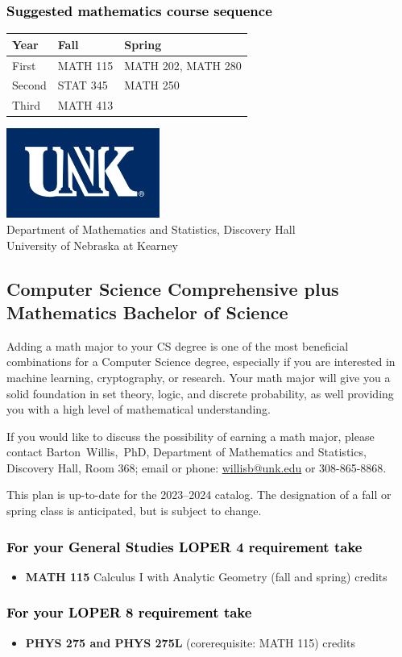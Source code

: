 \documentclass[11pt]{article}
\makeatletter
\newcommand{\calcone}{\textbf{MATH 115} Calculus I with Analytic Geometry (fall and spring) \dotfill 5 credits}
\newcommand{\calconeshort}{MATH 115}
\newcommand{\calctwoshort}{MATH 202}
\newcommand{\foundationsshort}{MATH 250}
\newcommand{\linearshort}{MATH 280}
\newcommand{\discreteshort}{MATH 413}
\newcommand{\appliedstatshort}{STAT 345}
\newcommand{\physics}{\textbf{PHYS 275 and PHYS 275L}  (corerequisite: \calconeshort) \dotfill 5 credits}
\newcommand{\contactbw}{\mbox{Barton Willis, PhD}, Department of Mathematics and Statistics,  Discovery Hall, Room 368;
email or phone: \href{mailto:willisb@unk.edu}{willisb@unk.edu} or 308-865-8868.}
\newcommand{\forinfo}[2]{If you would like to discuss the possibility of earning a math {#1}, please contact \contactbw}
\newcommand{\catalog}{2023--2024 }
\newcommand{\LOPER}{LOPER\xspace}
\newcommand{\uptodate}{This plan is up-to-date for  the \catalog catalog. The designation of a fall or spring class is 
anticipated, but  is subject to change.}
\newcommand{\myheading}{
\begin{flushleft}
\includegraphics[scale=0.35]{unk-logo}\\
\setcounter{footnote}{0}
\vspace{0.25in}
 \textcolor{unkblue}{Department of Mathematics and Statistics, Discovery Hall} \\
  \textcolor{unkblue}{University of Nebraska at Kearney}
\end{flushleft}}
\newcommand{\mathminor}{
  \begin{center}
   \begin{tabular}[h]{| l | l | l|} 
      \hline
      \textbf{Year} & \textbf{Fall}         &  \textbf{Spring}  \\ \hline 
      First & \calconeshort & \calctwoshort, \linearshort \\  \hline
      Second &  \appliedstatshort{} &  \foundationsshort \\ \hline
      Third &    \discreteshort              &  \\ \hline
      \end{tabular}
      \end{center}}
\makeatother
\begin{document}
\vspace{-0.1in}
\subsubsection*{\textcolor{black}{Suggested mathematics course sequence}}

\begin{center}
\mathminor
\end{center}


 


\newpage

\myheading



\vspace{-0.1in}
\subsection*{\textbf{\textcolor{unkblue}{Computer Science Comprehensive plus Mathematics Bachelor of Science}}}

Adding a math major to your CS degree is one of the most beneficial combinations for 
a Computer Science degree, especially if you are interested in machine learning, 
cryptography,   or research.  Your math major  will give you a solid foundation 
in set theory, logic, and discrete probability, 
as well providing you with a high level of mathematical understanding. 



\forinfo{major}{Computer Science Comprehensive degree}

\uptodate

\subsubsection*{\textcolor{black}{For your General Studies \LOPER 4 requirement take}}
\begin{itemize}
\item \calcone
\end{itemize}

\subsubsection*{\textcolor{black}{For your \LOPER 8 requirement take}}

\begin{itemize}
   \item \physics 
\end{itemize}
\end{document}
